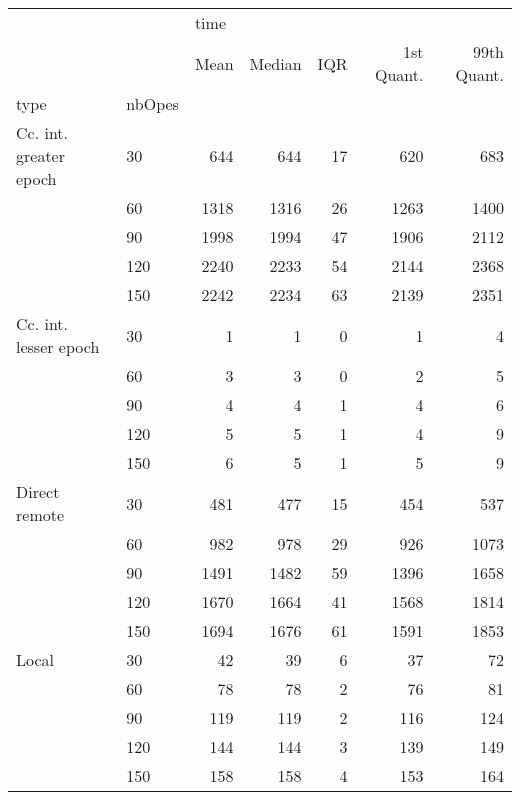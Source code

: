 \begin{tabular}{llrrrrr}
\toprule
      &     & \multicolumn{5}{l}{time} \\
      &     & Mean & Median & IQR & 1st Quant. & 99th Quant. \\
type & nbOpes &      &        &     &            &             \\
\midrule
Cc. int. greater epoch & 30  &  644 &    644 &  17 &        620 &         683 \\
      & 60  & 1318 &   1316 &  26 &       1263 &        1400 \\
      & 90  & 1998 &   1994 &  47 &       1906 &        2112 \\
      & 120 & 2240 &   2233 &  54 &       2144 &        2368 \\
      & 150 & 2242 &   2234 &  63 &       2139 &        2351 \\
Cc. int. lesser epoch & 30  &    1 &      1 &   0 &          1 &           4 \\
      & 60  &    3 &      3 &   0 &          2 &           5 \\
      & 90  &    4 &      4 &   1 &          4 &           6 \\
      & 120 &    5 &      5 &   1 &          4 &           9 \\
      & 150 &    6 &      5 &   1 &          5 &           9 \\
Direct remote & 30  &  481 &    477 &  15 &        454 &         537 \\
      & 60  &  982 &    978 &  29 &        926 &        1073 \\
      & 90  & 1491 &   1482 &  59 &       1396 &        1658 \\
      & 120 & 1670 &   1664 &  41 &       1568 &        1814 \\
      & 150 & 1694 &   1676 &  61 &       1591 &        1853 \\
Local & 30  &   42 &     39 &   6 &         37 &          72 \\
      & 60  &   78 &     78 &   2 &         76 &          81 \\
      & 90  &  119 &    119 &   2 &        116 &         124 \\
      & 120 &  144 &    144 &   3 &        139 &         149 \\
      & 150 &  158 &    158 &   4 &        153 &         164 \\
\bottomrule
\end{tabular}
